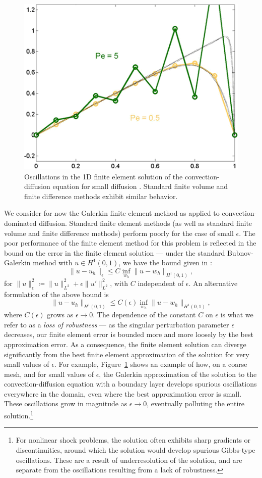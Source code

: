 \begin{figure}[!h]
\centering
\includegraphics[scale=.5]{figs/GalerkinOscTight.png}
\caption{Oscillations in the 1D finite element solution of the convection-diffusion equation for small diffusion \cite{GalerkinOsc}. Standard finite volume and finite difference methods exhibit similar behavior.}
\label{fig:GalerkinOsc}
\end{figure}
We consider for now the Galerkin finite element method as applied to convection-dominated diffusion.  Standard finite element methods (as well as standard finite volume and finite difference methods) perform poorly for the case of small $\epsilon$.  The poor performance of the finite element method for this problem is reflected in the bound on the error in the finite element solution --- under the standard Bubnov-Galerkin method with $u\in H^1(0,1)$, we have the bound given in \cite{roos2008robust}:
\[
\|u-u_h\|_\epsilon \leq C \inf_{w_h}\|u-w_h\|_{H^1(0,1)},
\]
for $\|u\|_\epsilon^2 \coloneqq \|u\|_{L^2}^2 + \epsilon \|u'\|_{L^2}^2$, with $C$ independent of $\epsilon$. An alternative formulation of the above bound is 
\[
\|u-u_h\|_{H^1(0,1)} \leq C(\epsilon) \inf_{w_h}\|u-w_h\|_{H^1(0,1)},
\]
where $C(\epsilon)$ grows as $\epsilon\rightarrow 0$. The dependence of the constant $C$ on $\epsilon$ is what we refer to as a \textit{loss of robustness} --- as the singular perturbation parameter $\epsilon$ decreases, our finite element error is bounded more and more loosely by the best approximation error.  As a consequence, the finite element solution can diverge significantly from the best finite element approximation of the solution for very small values of $\epsilon$.  For example, Figure~\ref{fig:GalerkinOsc} shows an example of how, on a coarse mesh, and for small values of $\epsilon$, the Galerkin approximation of the solution to the convection-diffusion equation with a boundary layer develops spurious oscillations everywhere in the domain, even where the best approximation error is small.  These oscillations grow in magnitude as $\epsilon \rightarrow 0$, eventually polluting the entire solution.\footnote{For nonlinear shock problems, the solution often exhibits sharp gradients or discontinuities, around which the solution would develop spurious Gibbs-type oscillations. These are a result of underresolution of the solution, and are separate from the oscillations resulting from a lack of robustness.}

